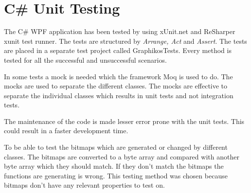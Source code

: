 \section{C\# Unit Testing}
The C\# WPF application has been tested by using xUnit.net and ReSharper xunit test runner. The tests are structured by \emph{Arrange, Act} and \emph{Assert}. The tests are placed in a separate test project called GraphikosTests. Every method is tested for all the successful and unsuccessful scenarios.

In some tests a mock is needed which the framework Moq is used to do. The mocks are used to separate the different classes. The mocks are effective to separate the individual classes which results in unit tests and not integration tests.

The maintenance of the code is made lesser error prone with the unit tests. This could result in a faster development time.

To be able to test the bitmaps which are generated or changed by different classes. The bitmaps are converted to a byte array and compared with another byte array which they should match. If they don’t match the bitmaps the functions are generating is wrong. This testing method was chosen because bitmaps don’t have any relevant properties to test on.